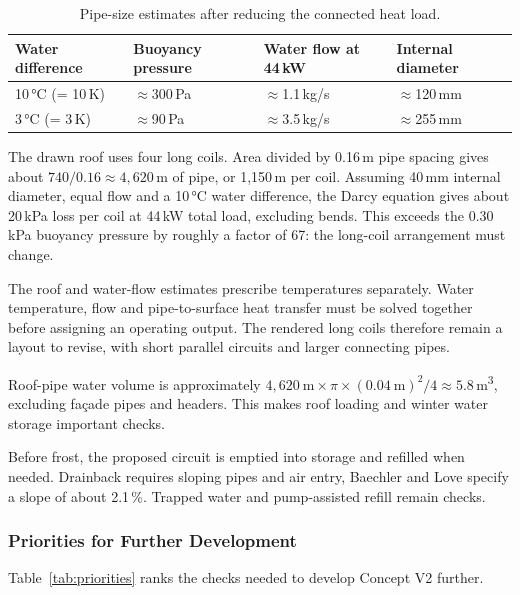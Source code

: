 \begin{table}[H]
\centering\small
\caption{Pipe-size estimates after reducing the connected heat load.}
\label{tab:pipesize2}
\renewcommand{\arraystretch}{1.2}
\begin{tabular}{l l l l}
\toprule
\textbf{Water difference} & \textbf{Buoyancy pressure} & \textbf{Water flow at 44\,kW} & \textbf{Internal diameter} \\
\midrule
10\,°C (= 10\,K) & $\approx$300\,Pa & $\approx$1.1\,kg/s & $\approx$120\,mm \\
3\,°C (= 3\,K) & $\approx$90\,Pa & $\approx$3.5\,kg/s & $\approx$255\,mm \\
\bottomrule
\end{tabular}
\end{table}

The drawn roof uses four long coils. Area divided by 0.16\,m pipe spacing gives about
$740/0.16 \approx 4{,}620$\,m of pipe, or 1,150\,m per coil. Assuming 40\,mm internal
diameter, equal flow and a 10\,°C water difference, the Darcy equation gives about
20\,kPa loss per coil at 44\,kW total load, excluding bends. This exceeds the 0.30\,kPa
buoyancy pressure by roughly a factor of 67: the long-coil arrangement must change.

The roof and water-flow estimates prescribe temperatures separately. Water temperature,
flow and pipe-to-surface heat transfer must be solved together before assigning an
operating output. The rendered long coils therefore remain a layout to revise, with
short parallel circuits and larger connecting pipes.

Roof-pipe water volume is approximately
$4{,}620\ \text{m} \times \pi \times (0.04\ \text{m})^2 / 4 \approx 5.8$\,m\textsuperscript{3},
excluding façade pipes and headers. This makes roof loading and winter water storage
important checks.

\label{sec:winter}
Before frost, the proposed circuit is emptied into storage and refilled when needed.
Drainback requires sloping pipes and air entry, Baechler and Love
\cite[Ch.~3]{baechler2007} specify a slope of about 2.1\,\%. Trapped water and pump-assisted
refill remain checks.

\subsubsection{Priorities for Further Development}
\label{sec:priorities}

Table~\ref{tab:priorities} ranks the checks needed to develop Concept V2 further.

